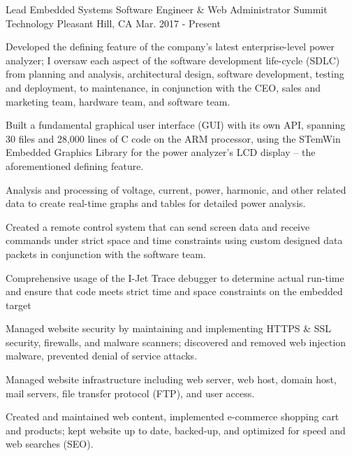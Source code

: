 


\begin{cventries}


\cventry
{Lead Embedded Systems Software Engineer \& Web Administrator} %
{Summit Technology} %
{Pleasant Hill, CA} %
{Mar. 2017 - Present} %
{ %
\begin{cvitems}
\item {Developed the defining feature of the company's latest enterprise-level power analyzer; I oversaw each aspect of the software development life-cycle (SDLC) from planning and analysis, architectural design, software development, testing and deployment, to maintenance, in conjunction with the CEO, sales and marketing team, hardware team, and software team.}
\item {Built a fundamental graphical user interface (GUI) with its own API, spanning 30 files and 28,000 lines of C code on the ARM processor, using the STemWin Embedded Graphics Library for the power analyzer's LCD display -- the aforementioned defining feature.}
\item {Analysis and processing of voltage, current, power, harmonic, and other related data to create real-time graphs and tables for detailed power analysis.}
\item {Created a remote control system that can send screen data and receive commands under strict space and time constraints using custom designed data packets in conjunction with the software team.}
\item {Comprehensive usage of the I-Jet Trace debugger to determine actual run-time and ensure that code meets strict time and space constraints on the embedded target}
\item {Managed website security by maintaining and implementing HTTPS \& SSL security, firewalls, and malware scanners; discovered and removed web injection malware, prevented denial of service attacks.}
\item {Managed website infrastructure including web server, web host, domain host, mail servers, file transfer protocol (FTP), and user access.
\item {Created and maintained web content, implemented e-commerce shopping cart and products; kept website up to date, backed-up, and optimized for speed and web searches (SEO).}}
\end{cvitems}
}


\end{cventries}

